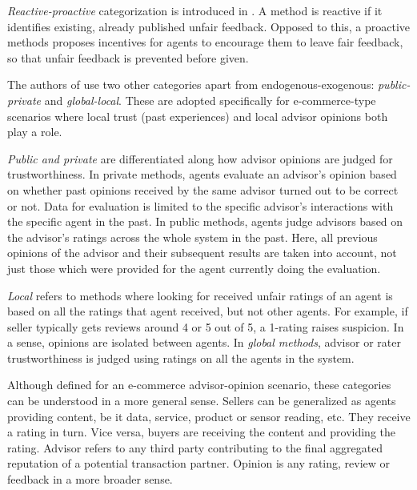 \documentclass[%
    ]{\PathToTumTemplate/thesis/tum_thesis}
\begin{document}
\emph{Reactive-proactive} categorization is introduced in \cite{thakur_reputation_2019}.
A method is reactive if it identifies existing, already published unfair feedback.
Opposed to this, a proactive methods proposes incentives for agents to encourage them to leave fair feedback, so that unfair feedback is prevented before given.

The authors of \cite{zhang_detailed_2008} use two other categories apart from endogenous-exogenous: \emph{public-private} and \emph{global-local}.
These are adopted specifically for e-commerce-type scenarios where local trust (past experiences) and local advisor opinions both play a role.

\emph{Public and private} are differentiated along how advisor opinions are judged for trustworthiness.
In private methods, agents evaluate an advisor's opinion based on whether past opinions received by the same advisor turned out to be correct or not.
Data for evaluation is limited to the specific advisor's interactions with the specific agent in the past.
In public methods, agents judge advisors based on the advisor's ratings across the whole system in the past.
Here, all previous opinions of the advisor and their subsequent results are taken into account, not just those which were provided for the agent currently doing the evaluation.

\emph{Local} refers to methods where looking for received unfair ratings of an agent is based on all the ratings that agent received, but not other agents.
For example, if seller typically gets reviews around 4 or 5 out of 5, a 1-rating raises suspicion.
In a sense, opinions are isolated between agents.
In \emph{global methods}, advisor or rater trustworthiness is judged using ratings on all the agents in the system.

Although defined for an e-commerce advisor-opinion scenario, these categories can be understood in a more general sense.
Sellers can be generalized as agents providing content, be it data, service, product or sensor reading, etc.
They receive a rating in turn.
Vice versa, buyers are receiving the content and providing the rating.
Advisor refers to any third party contributing to the final aggregated reputation of a potential transaction partner.
Opinion is any rating, review or feedback in a more broader sense.


\end{document}
